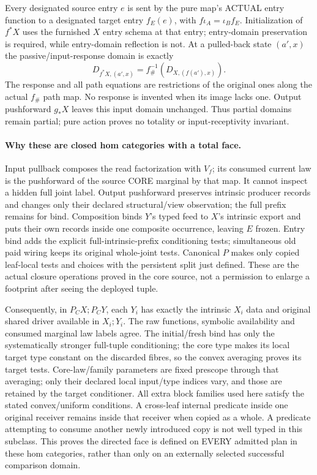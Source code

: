\documentclass[11pt]{article}
\begin{document}
Every designated source entry $e$ is sent by the pure map's ACTUAL entry function to a designated target entry $f_E(e)$, with $f\iota_A=\iota_Bf_E$. Initialization of $f^*X$ uses the furnished $X$ entry schema at that entry; entry-domain preservation is required, while entry-domain reflection is not. At a pulled-back state $(a',x)$ the passive/input-response domain is exactly
\[
 D_{f^*X,(a',x)}=f_\#^{-1}(D_{X,(f(a'),x)}).
\]
The response and all path equations are restrictions of the original ones along the actual $f_\#$ path map. No response is invented when its image lacks one. Output pushforward $g_*X$ leaves this input domain unchanged. Thus partial domains remain partial; pure action proves no totality or input-receptivity invariant. \paragraph{Why these are closed hom categories with a total face.}
Input pullback composes the read factorization with $V_f$; its consumed current law is the pushforward of the source CORE marginal by that map. It cannot inspect a hidden full joint label. Output pushforward preserves intrinsic producer records and changes only their declared structural/view observation; the full prefix remains for bind. Composition binds $Y$'s typed feed to $X$'s intrinsic export and puts their own records inside one composite occurrence, leaving $E$ frozen. Entry bind adds the explicit full-intrinsic-prefix conditioning tests; simultaneous old paid wiring keeps its original whole-joint tests. Canonical $P$ makes only copied leaf-local tests and choices with the persistent split just defined. These are the actual closure operations proved in the core source, not a permission to enlarge a footprint after seeing the deployed tuple.

Consequently, in $P_CX;P_CY$, each $Y_i$ has exactly the intrinsic $X_i$ data and original shared driver available in $X_i;Y_i$. The raw functions, symbolic availability and consumed marginal law labels agree. The initial/fresh bind has only the systematically stronger full-tuple conditioning; the core type makes its local target type constant on the discarded fibres, so the convex averaging proves its target tests. Core-law/family parameters are fixed prescope through that averaging; only their declared local input/type indices vary, and those are retained by the target conditioner. All extra block families used here satisfy the stated convex/uniform conditions. A cross-leaf internal predicate inside one original receiver remains inside that receiver when copied as a whole. A predicate attempting to consume another newly introduced copy is not well typed in this subclass. This proves the directed face is defined on EVERY admitted plan in these hom categories, rather than only on an externally selected successful comparison domain.
\end{document}
